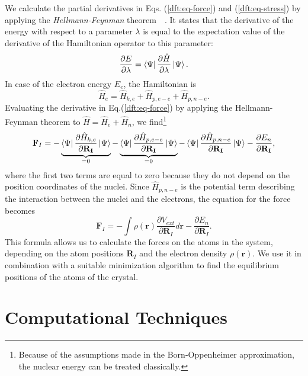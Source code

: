 \begin{refsection}
We calculate the partial derivatives in Eqs. (\ref{dft:eq-force}) and 
(\ref{dft:eq-stress}) by applying the \textit{Hellmann-Feynman}
theorem~\cite{Feynman1939}~\cite{Hellmann1937}. It states that the derivative 
of the energy with respect to a parameter $\lambda$ is equal to the 
expectation value of the derivative of the Hamiltonian operator to this 
parameter: 
\begin{equation} 
\frac{\partial E}{\partial \lambda} = \bra{\Psi} \frac{\partial 
\hat{H}}{\partial \lambda} \ket{\Psi}. 
\end{equation} 
In case of the electron energy $E_e$, the Hamiltonian is 
\begin{equation} 
\hat{H}_e = \hat{H}_{k,e} + \hat{H}_{p,e-e} + \hat{H}_{p,n-e}. 
\end{equation}
Evaluating the derivative in Eq.(\ref{dft:eq-force}) by applying the 
Hellmann-Feynman theorem to $\hat{H}=\hat{H}_e+\hat{H}_n$, we 
find\footnote{Because of the assumptions made in the Born-Oppenheimer 
approximation, the nuclear energy can be treated classically.} 
\begin{eqnarray} 
\mathbf{F}_I = - \underbrace{\bra{\Psi} \frac{\partial\hat{H}_{k,e}}{\partial 
\mathbf{R_I}} \ket{\Psi}}_{=0} - \underbrace{\bra{\Psi} 
\frac{\partial\hat{H}_{p,e-e}}{\partial \mathbf{R_I}} \ket{\Psi}}_{=0} - 
\bra{\Psi} \frac{\partial\hat{H}_{p,n-e}}{\partial \mathbf{R_I}} \ket{\Psi} - 
\frac{\partial E_n}{\partial \mathbf{R_I}}, 
\end{eqnarray} 
where the first two terms are equal to zero because they do not depend on the 
position coordinates of the nuclei. Since $\hat{H}_{p,n-e}$ is the potential 
term describing the interaction between the nuclei and the electrons, the 
equation for the force becomes 
\begin{equation} 
\mathbf{F}_I = - \int \rho(\mathbf{r}) \frac{\partial V_{ext}}{\partial 
\mathbf{R}_I}d\mathbf{r} - \frac{\partial E_n}{\partial\mathbf{R}_I}. 
\end{equation} 
This formula allows us to calculate the forces on the atoms in the system, 
depending on the atom positions $\mathbf{R}_I$ and the electron density 
$\rho(\mathbf{r})$. We use it in combination with a suitable minimization 
algorithm to find the equilibrium positions of the atoms of the crystal. 
 
\section{Computational Techniques}\label{dft:sec-computational} 
 

\end{refsection}
